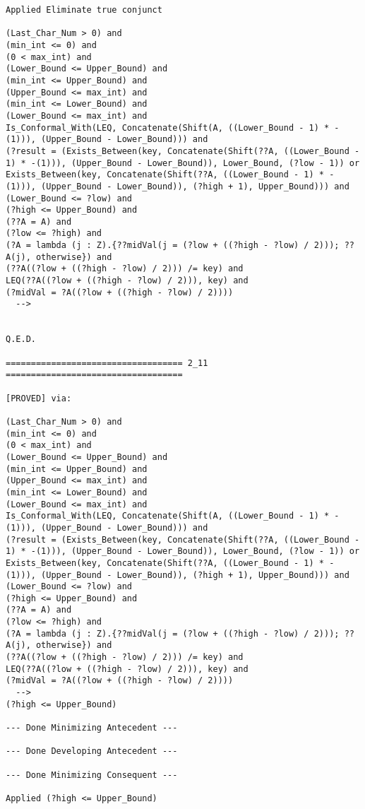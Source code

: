 \begin{lstlisting}[language=resolve]
Applied Eliminate true conjunct

(Last_Char_Num > 0) and
(min_int <= 0) and
(0 < max_int) and
(Lower_Bound <= Upper_Bound) and
(min_int <= Upper_Bound) and
(Upper_Bound <= max_int) and
(min_int <= Lower_Bound) and
(Lower_Bound <= max_int) and
Is_Conformal_With(LEQ, Concatenate(Shift(A, ((Lower_Bound - 1) * -(1))), (Upper_Bound - Lower_Bound))) and
(?result = (Exists_Between(key, Concatenate(Shift(??A, ((Lower_Bound - 1) * -(1))), (Upper_Bound - Lower_Bound)), Lower_Bound, (?low - 1)) or Exists_Between(key, Concatenate(Shift(??A, ((Lower_Bound - 1) * -(1))), (Upper_Bound - Lower_Bound)), (?high + 1), Upper_Bound))) and
(Lower_Bound <= ?low) and
(?high <= Upper_Bound) and
(??A = A) and
(?low <= ?high) and
(?A = lambda (j : Z).{??midVal(j = (?low + ((?high - ?low) / 2))); ??A(j), otherwise}) and
(??A((?low + ((?high - ?low) / 2))) /= key) and
LEQ(??A((?low + ((?high - ?low) / 2))), key) and
(?midVal = ?A((?low + ((?high - ?low) / 2))))
  -->


Q.E.D.

=================================== 2_11 ===================================

[PROVED] via:

(Last_Char_Num > 0) and
(min_int <= 0) and
(0 < max_int) and
(Lower_Bound <= Upper_Bound) and
(min_int <= Upper_Bound) and
(Upper_Bound <= max_int) and
(min_int <= Lower_Bound) and
(Lower_Bound <= max_int) and
Is_Conformal_With(LEQ, Concatenate(Shift(A, ((Lower_Bound - 1) * -(1))), (Upper_Bound - Lower_Bound))) and
(?result = (Exists_Between(key, Concatenate(Shift(??A, ((Lower_Bound - 1) * -(1))), (Upper_Bound - Lower_Bound)), Lower_Bound, (?low - 1)) or Exists_Between(key, Concatenate(Shift(??A, ((Lower_Bound - 1) * -(1))), (Upper_Bound - Lower_Bound)), (?high + 1), Upper_Bound))) and
(Lower_Bound <= ?low) and
(?high <= Upper_Bound) and
(??A = A) and
(?low <= ?high) and
(?A = lambda (j : Z).{??midVal(j = (?low + ((?high - ?low) / 2))); ??A(j), otherwise}) and
(??A((?low + ((?high - ?low) / 2))) /= key) and
LEQ(??A((?low + ((?high - ?low) / 2))), key) and
(?midVal = ?A((?low + ((?high - ?low) / 2))))
  -->
(?high <= Upper_Bound)

--- Done Minimizing Antecedent ---

--- Done Developing Antecedent ---

--- Done Minimizing Consequent ---

Applied (?high <= Upper_Bound)


\end{lstlisting}
